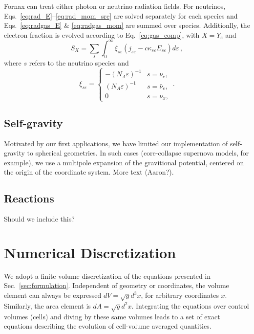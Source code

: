 \documentclass[iop]{emulateapj}
\begin{document}
Fornax can treat either photon or neutrino radiation fields.  For neutrinos, Eqs.~\ref{eq:rad_E}--\ref{eq:rad_mom_src} are solved separately for each species and Eqs.~\ref{eq:radgas_E} \& \ref{eq:radgas_mom} are summed over species.  Additionlly, the electron fraction is evolved according to Eq.~\ref{eq:gas_comp}, with $X=Y_e$ and
\begin{equation}
S_X = \sum_s \int_0^\infty \xi_{s\varepsilon} (j_{s\varepsilon} - c \kappa_{s\varepsilon} E_{s\varepsilon}) d\varepsilon \,,
\end{equation}
where $s$ refers to the neutrino species and
\begin{equation}
\xi_{s\varepsilon} = \begin{cases}
	-(N_A \varepsilon)^{-1}&	\text{$s=\nu_e$},\\
	(N_A \varepsilon)^{-1}&		\text{$s=\bar{\nu}_e$},\\
	0&							\text{$s=\nu_x$},
	\end{cases}\,.
\end{equation}


\subsection{Self-gravity}
Motivated by our first applications, we have limited our implementation of self-gravity to spherical geometries.  In such cases (core-collapse supernova models, for example), we use a multipole expansion of the gravitional potential, centered on the origin of the coordinate system.  More text (Aaron?).

\subsection{Reactions}
Should we include this?

\section{Numerical Discretization}
We adopt a finite volume discretization of the equations presented in Sec.~\ref{sec:formulation}.  Independent of geometry or coordinates, the volume element can always be expressed $dV=\sqrt{g} d^3x$, for arbitrary coordinates $x$.  Similarly, the area element is $dA=\sqrt{g} d^2x$.  Integrating the equations over control volumes (cells) and diving by these same volumes leads to a set of exact equations describing the evolution of cell-volume averaged quantities.
\end{document}
